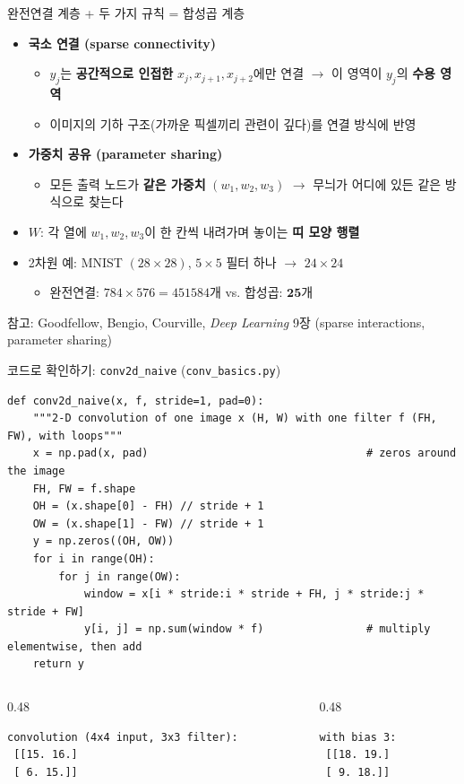 \documentclass[aspectratio=169,11pt]{beamer}
\begin{document}
\begin{frame}{완전연결 계층 + 두 가지 규칙 = 합성곱 계층}
\begin{itemize}
\item \textbf{국소 연결 (sparse connectivity)}
  \begin{itemize}
  \item $y_j$는 \textbf{공간적으로 인접한} $x_j,x_{j+1},x_{j+2}$에만 연결 $\to$ 이 영역이 $y_j$의 \textbf{수용 영역}
  \item 이미지의 기하 구조(가까운 픽셀끼리 관련이 깊다)를 연결 방식에 반영
  \end{itemize}
\item \textbf{가중치 공유 (parameter sharing)}
  \begin{itemize}
  \item 모든 출력 노드가 \textbf{같은 가중치} $(w_1,w_2,w_3)$ $\to$ 무늬가 어디에 있든 같은 방식으로 찾는다
  \end{itemize}
\item $W$: 각 열에 $w_1,w_2,w_3$이 한 칸씩 내려가며 놓이는 \textbf{띠 모양 행렬}
\item 2차원 예: MNIST $(28\times28)$, $5\times5$ 필터 하나 $\to$ $24\times24$
  \begin{itemize}
  \item 완전연결: $784\times576=451584$개 \quad vs. \quad 합성곱: $\mathbf{25}$개
  \end{itemize}
\end{itemize}
\vskip1mm
{\footnotesize\color{black!60} 참고: Goodfellow, Bengio, Courville, \emph{Deep Learning} 9장 (sparse interactions, parameter sharing)}
\end{frame}

\begin{frame}[fragile]{코드로 확인하기: \texttt{conv2d\_naive} (\texttt{conv\_basics.py})}
\begin{lstlisting}
def conv2d_naive(x, f, stride=1, pad=0):
    """2-D convolution of one image x (H, W) with one filter f (FH, FW), with loops"""
    x = np.pad(x, pad)                                  # zeros around the image
    FH, FW = f.shape
    OH = (x.shape[0] - FH) // stride + 1
    OW = (x.shape[1] - FW) // stride + 1
    y = np.zeros((OH, OW))
    for i in range(OH):
        for j in range(OW):
            window = x[i * stride:i * stride + FH, j * stride:j * stride + FW]
            y[i, j] = np.sum(window * f)                # multiply elementwise, then add
    return y
\end{lstlisting}
\begin{columns}[T,onlytextwidth]
\begin{column}{0.48\textwidth}
\begin{lstlisting}[language={}]
convolution (4x4 input, 3x3 filter):
 [[15. 16.]
 [ 6. 15.]]
\end{lstlisting}
\end{column}
\begin{column}{0.48\textwidth}
\begin{lstlisting}[language={}]
with bias 3:
 [[18. 19.]
 [ 9. 18.]]
\end{lstlisting}
\end{column}
\end{columns}
\end{frame}
\end{document}
